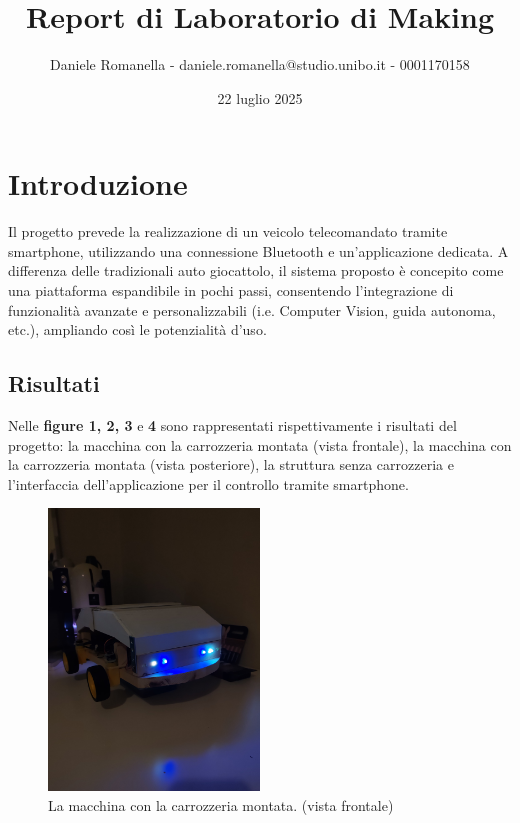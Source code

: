\documentclass{article}
\title{Report di Laboratorio di Making}
\author{Daniele Romanella - daniele.romanella@studio.unibo.it - 0001170158}
\date{22 luglio 2025}
\begin{document}
\maketitle


\section{Introduzione}
Il progetto prevede la realizzazione di un veicolo telecomandato tramite smartphone, utilizzando una connessione Bluetooth e un'applicazione dedicata. A differenza delle tradizionali auto giocattolo, il sistema proposto è concepito come una piattaforma espandibile in pochi passi, consentendo l'integrazione di funzionalità avanzate e personalizzabili (i.e. Computer Vision, guida autonoma, etc.), ampliando così le potenzialità d’uso.

\subsection{Risultati}
Nelle \textbf{figure 1, 2, 3} e \textbf{4} sono rappresentati rispettivamente i risultati del progetto: la macchina con la carrozzeria montata (vista frontale), la macchina con la carrozzeria montata (vista posteriore), la struttura senza carrozzeria e l'interfaccia dell'applicazione per il controllo tramite smartphone.

\begin{figure}[h!]
  \centering
  \includegraphics[width=0.5\textwidth]{imgs/results_1.jpeg}
  \caption{La macchina con la carrozzeria montata. (vista frontale)}
  \label{fig:macchina_carrozzeria}
\end{figure}
\end{document}
